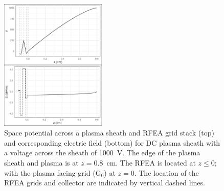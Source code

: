 \begin{figure}[htbp]
\centering
\includegraphics[width=0.45\textwidth]{Figures/VEz2DC1kVStack2332.jpeg}
\caption{Space potential across a plasma sheath and RFEA grid stack (top) and corresponding electric field (bottom) for DC plasma sheath with a voltage across the sheath of 1000~V. The edge of the plasma sheath and plasma is at $z=0.8$~cm. The RFEA is located at $z\le0$; with the plasma facing grid (G$_0$) at $z=0$. The location of the RFEA grids and collector are indicated by vertical dashed lines.}
\label{fig:DCpotentialField}
\end{figure}



